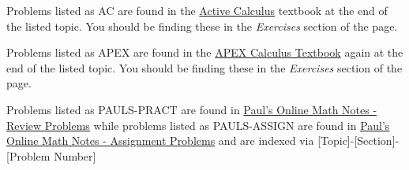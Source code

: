 \documentclass[12pt]{article}
\title{}
\author{MATH 1271, Garrett Credi}
\date{}
\begin{document}
\maketitle

Problems listed as AC are found in the \href{https://activecalculus.org/single2e/frontmatter.html}{Active Calculus} 
textbook at the end of the listed topic. You should be finding these in the \textit{Exercises} section of the page.

Problems listed as APEX are found in the \href{https://opentext.uleth.ca/apex-calculus/apex-calculus.html}{APEX Calculus Textbook}
again at the end of the listed topic. You should be finding these in the \textit{Exercises} section of the page.

Problems listed as PAULS-PRACT are found in \href{https://tutorial.math.lamar.edu/Problems/CalcI/CalcI.aspx}{Paul's Online Math Notes - Review Problems}
while problems listed as PAULS-ASSIGN are found in \href{https://tutorial.math.lamar.edu/ProblemsNS/CalcI/CalcI.aspx}{Paul's Online Math Notes - Assignment Problems}
and are indexed via [Topic]-[Section]-[Problem Number]



\end{document}
